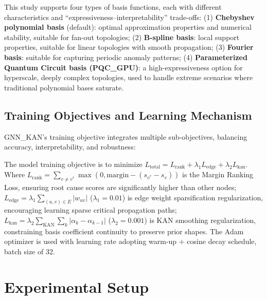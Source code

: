 \documentclass[conference]{IEEEtran}
\begin{document}
This study supports four types of basis functions, each with different characteristics and ``expressiveness--interpretability'' trade-offs: (1) \textbf{Chebyshev polynomial basis} (default): optimal approximation properties and numerical stability, suitable for fan-out topologies; (2) \textbf{B-spline basis}: local support properties, suitable for linear topologies with smooth propagation; (3) \textbf{Fourier basis}: suitable for capturing periodic anomaly patterns; (4) \textbf{Parameterized Quantum Circuit basis (PQC\_GPU)}: a high-expressiveness option for hyperscale, deeply complex topologies, used to handle extreme scenarios where traditional polynomial bases saturate.

\subsection{Training Objectives and Learning Mechanism}

GNN\_KAN's training objective integrates multiple sub-objectives, balancing accuracy, interpretability, and robustness:

The model training objective is to minimize $L_{\text{total}} = L_{\text{rank}} + \lambda_1 L_{\text{edge}} + \lambda_2 L_{\text{kan}}$. Where $L_{\text{rank}} = \sum_{v \neq v^*} \max(0, \text{margin} - (s_{v^*} - s_v))$ is the Margin Ranking Loss, ensuring root cause scores are significantly higher than other nodes; $L_{\text{edge}} = \lambda_1 \sum_{(u,v)\in E} |w_{uv}|$ ($\lambda_1=0.01$) is edge weight sparsification regularization, encouraging learning sparse critical propagation paths; $L_{\text{kan}} = \lambda_2 \sum_{\text{KAN}} \sum_k |\alpha_k - \alpha_{k-1}|$ ($\lambda_2=0.001$) is KAN smoothing regularization, constraining basis coefficient continuity to preserve prior shapes. The Adam optimizer is used with learning rate adopting warm-up + cosine decay schedule, batch size of 32.

\section{Experimental Setup}
\end{document}
